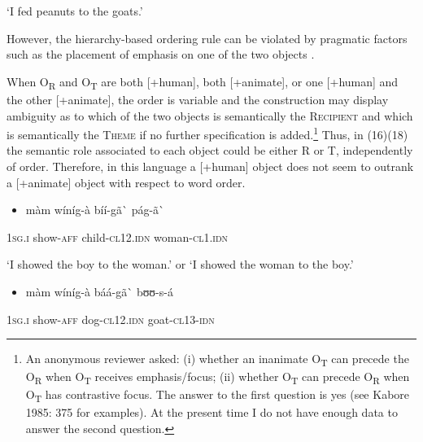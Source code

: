 \documentclass[output=paper]{langsci/langscibook}
\begin{document}
{{\begin{styleTranslation}
‘I fed peanuts to the goats.’
\end{styleTranslation}

However, the hierarchy-based ordering rule can be violated by pragmatic factors such as the placement of emphasis on one of the two objects \citep[375]{Kabore1985}.

When O\textsubscript{R} and O\textsubscript{T} are both [+human], both [+animate], or one [+human] and the other [+animate],  the order is variable and the construction may display ambiguity as to which of the two objects is semantically the \textsc{Recipient} and which is semantically the \textsc{Theme} if no further specification is added.\footnote{ An anonymous reviewer asked: (i) whether an inanimate O\textsubscript{T} can precede the O\textsubscript{R} when O\textsubscript{T} receives emphasis/focus; (ii) whether O\textsubscript{T }can precede O\textsubscript{R} when O\textsubscript{T} has contrastive focus. The answer to the first question is yes (see Kabore 1985: 375 for examples). At the present time I do not have enough data to answer the second question.} Thus, in (16)(18) the semantic role associated to each object could be either R or T, independently of order. Therefore, in this language a [+human] object does not seem to outrank a [+animate] object with respect to word order.

\begin{itemize}
\item \begin{styleNumberedEX}
\label{bkm:Ref424143119}m\`{a}m    w\'{i}n\'{i}g-\`{a}    b\'{i}\'{i}-g\~{a}\`{ }      p\'{a}g-\~{a}\`{ }
\end{styleNumberedEX}\end{itemize}
\begin{styleGloss}
\textsc{1sg.i  }  show-\textsc{aff}    child-\textsc{cl12.idn}  woman-\textsc{cl1.idn}
\end{styleGloss}

\begin{styleTranslation}
‘I showed the boy to the woman.’ or ‘I showed the woman to the boy.’
\end{styleTranslation}

\begin{itemize}
\item \begin{styleNumberedEX}
m\`{a}m    w\'{i}n\'{i}g-\`{a}    b\'{a}\'{a}-g\~{a}\`{ }    bʊʊ-s-\'{a}
\end{styleNumberedEX}\end{itemize}
\begin{styleGloss}
\textsc{1sg.i  }  show-\textsc{aff}    dog-\textsc{cl12.idn}  goat-\textsc{cl13-idn}
\end{styleGloss}

}}
\end{document}
